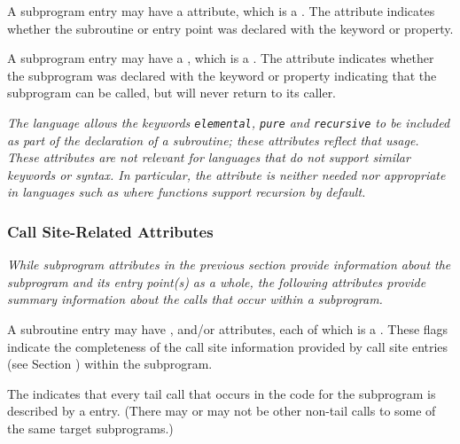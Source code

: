 A\hypertarget{chap:DWATrecursiverecursivepropertyofasubroutine}{}
subprogram entry may have a 
\DWATrecursiveDEFN{} attribute, which
is a . 
The attribute indicates whether the subroutine
or entry point was declared with the  keyword
or property.

A subprogram entry may have a 
\DWATnoreturnDEFN{}
, 
which is a \CLASSflag. The attribute 
indicates whether the subprogram was declared with the  keyword or property 
indicating that the subprogram can be called, but will never return to its caller.

\textit{The  
language allows the keywords \texttt{elemental}, \texttt{pure}
and \texttt{recursive} to be included as part of the declaration of
a subroutine; these attributes reflect that usage. These
attributes are not relevant for languages that do not support
similar keywords or syntax. In particular, the \DWATrecursiveNAME{}
attribute is neither needed nor appropriate in languages such
as  where functions support recursion by default.}


\subsubsection{Call Site-Related Attributes}
\textit{While subprogram attributes in the previous section provide
information about the subprogram and its entry point(s) as a whole,
the following attributes provide summary information about the calls
that occur within a subprogram.}

A subroutine entry may have \DWATcallalltailcalls, 
\DWATcallallcalls{} and/or \DWATcallallsourcecalls{} 
attributes, each of which is a \CLASSflag.
These flags indicate the completeness of the call site 
information provided by call site entries (see 
Section ) within the subprogram.

The \DWATcallalltailcallsDEFN{}
indicates that every tail call 
that occurs in the code for the subprogram is described by a 
\DWTAGcallsite{} entry. 
(There may or may not be other non-tail calls to some of the same 
target subprograms.)

